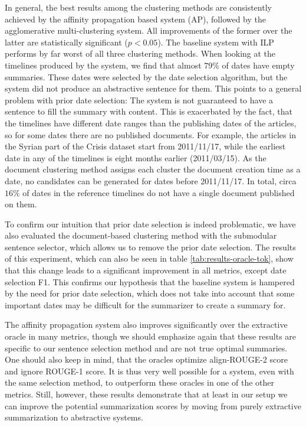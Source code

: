 \documentclass[a4paper,BCOR=10mm]{report}
\numberwithin{lemma}{chapter}
\numberwithin{definition}{chapter}
\begin{document}
In general, the best results among the clustering methods are consistently achieved by the affinity propagation based system (AP), followed by the agglomerative multi-clustering system. All improvements of the former over the latter are statistically significant ($p < 0.05$). The baseline system with ILP performs by far worst of all three clustering methods. When looking at the timelines produced by the system, we find that almost $79\%$ of dates have empty summaries. These dates were selected by the date selection algorithm, but the system did not produce an abstractive sentence for them. This points to a general problem with prior date selection: The system is not guaranteed to have a sentence to fill the summary with content. This is exacerbated by the fact, that the timelines have different date ranges than the publishing dates of the articles, so for some dates there are no published documents. For example, the articles in the Syrian part of the Crisis dataset start from 2011/11/17, while the earliest date in any of the timelines is eight months earlier (2011/03/15). As the document clustering method assigns each cluster the document creation time as a date, no candidates can be generated for dates before 2011/11/17. In total, circa $16\%$ of dates in the reference timelines do not have a single document published on them.

To confirm our intuition that prior date selection is indeed problematic, we have also evaluated the document-based clustering method with the submodular sentence selector, which allows us to remove the prior date selection. The results of this experiment, which can also be seen in table \ref{tab:results-oracle-tok}, show that this change leads to a significant improvement in all metrics, except date selection F1.
This confirms our hypothesis that the baseline system is hampered by the need for prior date selection, which does not take into account that some important dates may be difficult for the summarizer to create a summary for.



The affinity propagation system also improves significantly over the extractive oracle in many metrics, though we should emphasize again that these results are specific to our sentence selection method and are not true optimal summaries. One should also keep in mind, that the oracles optimize align-ROUGE-2 score and ignore ROUGE-1 score. It is thus very well possible for a system, even with the same selection method, to outperform these oracles in one of the other metrics. Still, however, these results demonstrate that at least in our setup we can improve the potential summarization scores by moving from purely extractive summarization to abstractive systems.
\end{document}
